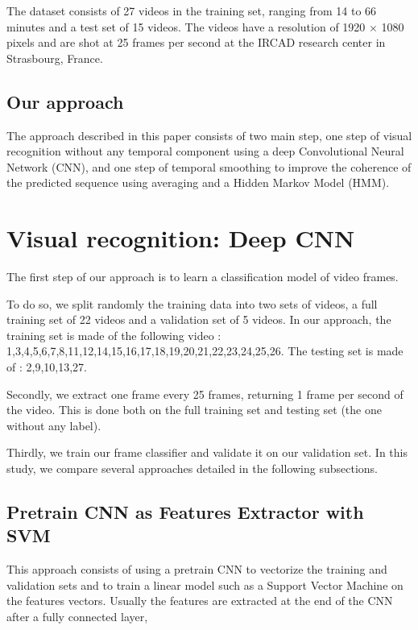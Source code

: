 \documentclass[10pt,twocolumn,letterpaper]{article}
\begin{document}
The dataset consists of 27 videos in the training set, ranging from 14 to 66
minutes and a test set of 15 videos. The videos have a resolution of 1920 $\times$
1080 pixels and are shot at 25 frames per second at the IRCAD research center in
Strasbourg, France.

\subsection{Our approach}

The approach described in this paper consists of two main step, one step of visual
recognition without any temporal component using a deep Convolutional Neural
Network (CNN), and one step of temporal smoothing to improve the coherence of the
predicted sequence using averaging and a Hidden Markov Model (HMM).

\section{Visual recognition: Deep CNN}

The first step of our approach is to learn a classification model of video frames.

To do so, we split randomly the training data into two sets of videos, a full training set of 22 videos and a validation
set of 5 videos. In our approach, the training set is made of the following video : 1,3,4,5,6,7,8,11,12,14,15,16,17,18,19,20,21,22,23,24,25,26. The testing set is made of : 2,9,10,13,27.

Secondly, we extract one frame every 25 frames, returning 1 frame per second
of the video. This is done both on the full training set and testing set (the one without any label).

Thirdly, we train our frame classifier and validate it on our validation set. In this study, we compare several approaches detailed in the following subsections.

\subsection{Pretrain CNN as Features Extractor with SVM}

This approach consists of using a pretrain CNN to vectorize the training and validation sets and to train a linear model such as a Support Vector Machine on the features vectors.
Usually the features are extracted at the end of the CNN after a fully connected layer,
\end{document}
